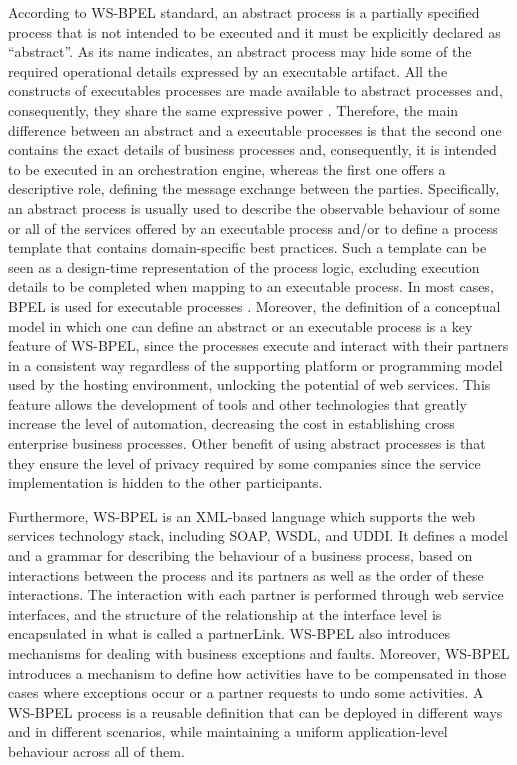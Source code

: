 According to WS-BPEL standard, an  abstract process is a partially specified process that is not intended to be executed
and it must be explicitly declared as ``abstract''. As its name indicates, 
an abstract process may hide some of the required 
operational details expressed by an executable artifact.
All the constructs of executables processes are made available to abstract processes
and, consequently, they share the same expressive power \cite{wsbpelstandard}. 
Therefore, the main difference between an abstract and a executable processes is 
that the second one contains the exact details of business processes and, consequently,
it is intended to be executed in an orchestration engine, whereas the first one offers a descriptive role,
defining the message exchange between the parties. Specifically, an abstract process is usually used to 
describe the observable behaviour of some or all of the services offered by an
executable process and/or to define a process template that contains domain-specific best practices. 
Such a template can be seen as a design-time representation of the process logic, excluding execution details to be
completed when mapping to an executable process.
In most cases, BPEL is used for
executable processes \cite{wsbpelstandard}.
Moreover, the definition of a conceptual model in which one can define an abstract or an executable
process is a key feature of WS-BPEL, since the processes execute and interact with their
partners in a consistent way regardless of the supporting platform or programming model used
by the hosting environment, unlocking the potential of
web services. This feature allows the development of tools and other technologies that greatly
increase the level of automation, decreasing the cost in establishing cross enterprise
business processes. Other benefit of using abstract processes is that they ensure 
the level of privacy required by some 
companies since the service implementation is hidden to the other participants. 

Furthermore, WS-BPEL is an XML-based language which
supports the web services technology stack, including SOAP, WSDL, and UDDI. 
It defines a model and a grammar for describing the behaviour of a business process,
based on interactions between the process and its partners as well as the order of these interactions. 
The interaction with each partner is performed through web service interfaces, 
and the structure of the relationship at the interface level
is encapsulated in what is called a partnerLink. WS-BPEL also introduces 
mechanisms for dealing with business exceptions and faults. Moreover, WS-BPEL
introduces a mechanism to define how activities have to be compensated in those cases 
where exceptions occur or a partner requests to undo some activities.
A WS-BPEL process is a reusable definition that can be deployed in different ways and in
different scenarios, while maintaining a uniform application-level behaviour across all of them.


